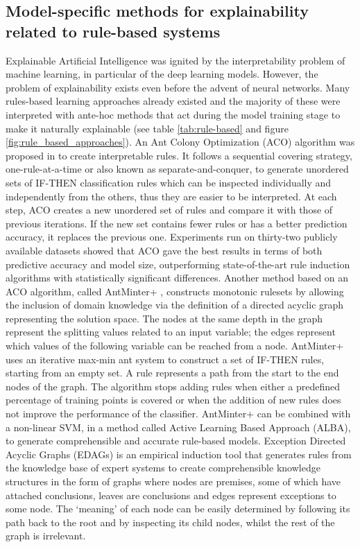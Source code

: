 \documentclass[final,1p,times]{elsarticle}
\begin{document}
\subsection{Model-specific methods for explainability related to rule-based systems}
Explainable Artificial Intelligence was ignited by the interpretability problem of machine learning, in particular of the deep learning models. However, the problem of explainability exists even before the advent of neural networks.
Many rules-based learning approaches already existed and the majority of these were interpreted with ante-hoc methods that act during the model training stage to make it naturally explainable (see table \ref{tab:rule-based} and figure \ref{fig:rule_based_approaches}).
An Ant Colony Optimization (ACO) algorithm was proposed in \cite{otero2016improving} to create interpretable rules. It follows a sequential covering strategy, one-rule-at-a-time or also known as separate-and-conquer, to generate unordered sets of IF-THEN classification rules which can be inspected individually and independently from the others, thus they are easier to be interpreted. At each step, ACO creates a new unordered set of rules and compare it with those of previous iterations. If the new set contains fewer rules or has a better prediction accuracy, it replaces the previous one. Experiments run on thirty-two publicly available datasets showed that ACO gave the best results in terms of both predictive accuracy and model size, outperforming state-of-the-art rule induction algorithms with statistically significant differences.
Another method based on an ACO algorithm, called AntMinter+ \cite{verbeke2011building}, constructs monotonic rulesets by allowing the inclusion of domain knowledge via the definition of a directed acyclic graph representing the solution space. The nodes at the same depth in the graph represent the splitting values related to an input variable; the edges represent which values of the following variable can be reached from a node. AntMinter+ uses an iterative max-min ant system to construct a set of IF-THEN rules, starting from an empty set. A rule represents a path from the start to the end nodes of the graph. The algorithm stops adding rules when either a predefined percentage of training points is covered or when the addition of new rules does not improve the performance of the classifier. AntMinter+ can be combined with a non-linear SVM, in a method called Active Learning Based Approach (ALBA), to generate comprehensible and accurate rule-based models. 
Exception Directed Acyclic Graphs (EDAGs) \cite{gaines1996transforming} is an empirical induction tool that generates rules from the knowledge base of expert systems to create comprehensible knowledge structures in the form of graphs where nodes are premises, some of which have attached conclusions, leaves are conclusions and edges represent exceptions to some node. The `meaning' of each node can be easily determined by following its path back to the root and by inspecting its child nodes, whilst the rest of the graph is irrelevant.\\
\end{document}
